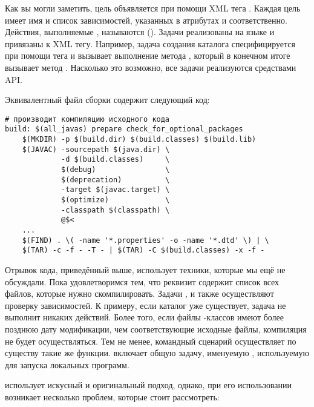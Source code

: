 Как вы могли заметить, цель объявляется при помощи XML тега
. Каждая цель имеет имя и список зависимостей,
указанных в атрибутах  и 
соответственно. Действия, выполняемые , называются
 (). Задачи реализованы на языке
\Java{} и привязаны к XML тегу. Например, задача создания каталога
специфицируется при помощи тега  и вызывает
выполнение метода , который в конечном итоге
вызывает метод . Насколько это возможно, все
задачи реализуются средствами \Java{} API.

Эквивалентный файл сборки \GNUmake{} содержит следующий код:

{\footnotesize
\begin{verbatim}
# производит компиляцию исходного кода
build: $(all_javas) prepare check_for_optional_packages
    $(MKDIR) -p $(build.dir) $(build.classes) $(build.lib)
    $(JAVAC) -sourcepath $(java.dir) \
             -d $(build.classes)     \
             $(debug)                \
             $(deprecation)          \
             -target $(javac.target) \
             $(optimize)             \
             -classpath $(classpath) \
             @$<
    ...
    $(FIND) . \( -name '*.properties' -o -name '*.dtd' \) | \
    $(TAR) -c -f - -T - | $(TAR) -C $(build.classes) -x -f -

\end{verbatim}
}

Отрывок кода, приведённый выше, использует техники, которые мы ещё не
обсуждали. Пока удовлетворимся тем, что реквизит 
содержит список всех \filename{java} файлов, которые нужно
скомпилировать. Задачи  \command{<mkdir>},
 и  также осуществляют проверку
зависимостей. К примеру, если каталог уже существует, задача
 не выполнит никаких действий. Более того, если файлы
\Java{}\hyp{}классов имеют более позднюю дату модификации, чем
соответствующие исходные файлы, компиляция не будет осуществляться.
Тем не менее, командный сценарий \GNUmake{} осуществляет по существу
такие же функции. \utility{Ant} включает общую задачу, именуемую
\command{<exec>}, используемую для запуска локальных программ.

\utility{Ant} использует искусный и оригинальный подход, однако, при
его использовании возникает несколько проблем, которые стоит
рассмотреть:

